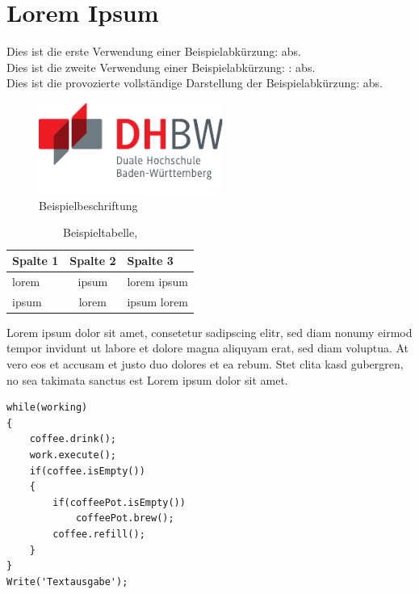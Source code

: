 \chapter{Lorem Ipsum}
Dies ist die erste Verwendung einer Beispielabkürzung: \ac{abs}.\\
Dies ist die zweite Verwendung einer Beispielabkürzung: : \ac{abs}.\\
Dies ist die provozierte vollständige Darstellung der Beispielabkürzung: \acf{abs}.

\begin{figure}[h]
    \centering
    \includegraphics[height=3cm]{images/dhbw_de.pdf}
    \caption{Beispielbeschriftung}
\end{figure}


\begin{table}[htbp]         %
\begin{tabular}{lcl}        %
	\hline                  %
	\textbf{Spalte 1}   & \textbf{Spalte 2} & \textbf{Spalte 3} \\ \hline    %
	lorem               & ipsum             & lorem ipsum       \\
	ipsum               & lorem             & ipsum lorem
\end{tabular}
\label{tabellenname}
\caption{Beispieltabelle, \cite{lorem}}
\end{table}

Lorem ipsum dolor sit amet, consetetur sadipscing elitr, sed diam nonumy eirmod tempor invidunt ut labore et dolore magna aliquyam erat, sed diam voluptua. At vero eos et accusam et justo duo dolores et ea rebum. Stet clita kasd gubergren, no sea takimata sanctus est Lorem ipsum dolor sit amet. \cite{lorem} 

\newpage
\begin{lstlisting}[caption=Dies ist ein Listing,label=lstcode]
while(working)
{
    coffee.drink();
    work.execute();
    if(coffee.isEmpty())
    {
        if(coffeePot.isEmpty())
            coffeePot.brew();
        coffee.refill();
    }
}
Write('Textausgabe');
\end{lstlisting}  


